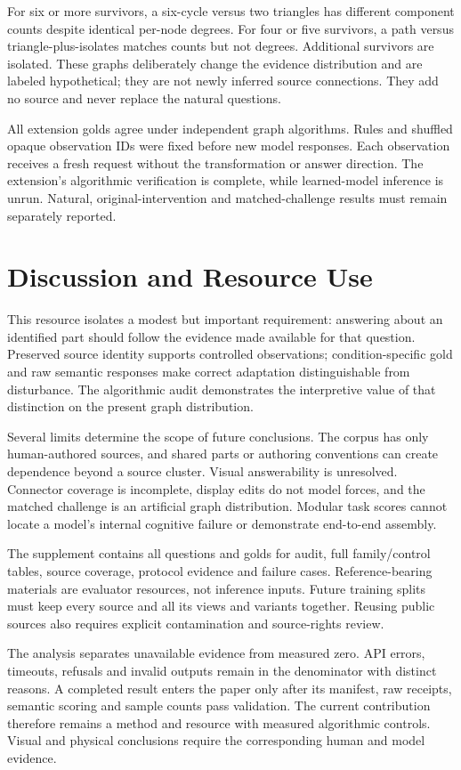 \documentclass[10pt,twocolumn,letterpaper]{article}
\begin{document}
For six or more survivors, a six-cycle versus two triangles has
different component counts despite identical per-node degrees.
For four or five survivors, a path versus triangle-plus-isolates
matches counts but not degrees. Additional survivors are isolated.
These graphs deliberately change the evidence distribution and are
labeled hypothetical; they are not newly inferred source connections.
They add no source and never replace the natural questions.

All extension golds agree under independent graph algorithms.
Rules and shuffled opaque observation IDs were fixed before new
model responses. Each observation receives a fresh request without
the transformation or answer direction. The extension's algorithmic
verification is complete, while learned-model inference is unrun.
Natural, original-intervention and matched-challenge results must
remain separately reported.

\section{Discussion and Resource Use}
This resource isolates a modest but important requirement: answering
about an identified part should follow the evidence made available
for that question. Preserved source identity supports controlled
observations; condition-specific gold and raw semantic responses make
correct adaptation distinguishable from disturbance. The algorithmic
audit demonstrates the interpretive value of that distinction on the
present graph distribution.

Several limits determine the scope of future conclusions. The corpus
has only \EvSources{} human-authored sources, and shared parts or
authoring conventions can create dependence beyond a source cluster.
Visual answerability is unresolved. Connector coverage is incomplete,
display edits do not model forces, and the matched challenge is an
artificial graph distribution. Modular task scores cannot locate a
model's internal cognitive failure or demonstrate end-to-end assembly.

The supplement contains all \EvTasks{} questions and golds for audit,
full family/control tables, source coverage, protocol evidence and
failure cases. Reference-bearing materials are evaluator resources,
not inference inputs. Future training splits must keep every source
and all its views and variants together. Reusing public sources also
requires explicit contamination and source-rights review.

The analysis separates unavailable evidence from measured zero.
API errors, timeouts, refusals and invalid outputs remain in the
denominator with distinct reasons. A completed result enters the
paper only after its manifest, raw receipts, semantic scoring and
sample counts pass validation. The current contribution therefore
remains a method and resource with measured algorithmic controls.
Visual and physical conclusions require the corresponding human
and model evidence.

{\small


}
\end{document}
